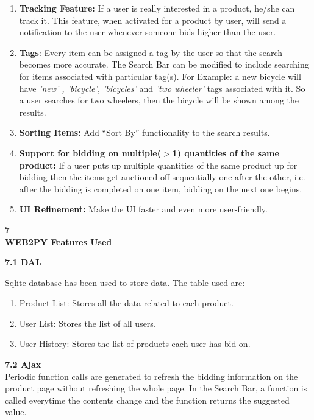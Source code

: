 \documentclass[a4paper,12pt]{article}
\begin{document}
{{\begin{enumerate}
\item
\textbf{Tracking Feature:} If a user is really interested in a product, he/she can track it. This feature, when activated for a product by user, will send a notification to the user whenever someone bids higher than the user.
\item
\textbf{Tags}: Every item can be assigned a tag by the user so that the search becomes more accurate. The Search Bar can be modified to include searching for items associated with particular tag(s). For Example: a new bicycle will have \emph{'new' , 'bicycle', 'bicycles'} and \emph{'two wheeler'} tags associated with it. So a user searches for two wheelers, then the bicycle will be shown among the results. 
\item
\textbf{Sorting Items:} Add ``Sort By'' functionality to the search results.
\item
\textbf{Support for bidding on multiple($>$1) quantities of the same product:} If a user puts up multiple quantities of the same product up for bidding then the items get auctioned off sequentially one after the other, i.e. after the bidding is completed on one item, bidding on the next one begins.
\item
\textbf{UI Refinement:} Make the UI faster and even more user-friendly.

\end{enumerate}

\huge{\textbf{7 \\ WEB2PY Features Used }} \\ \vspace{12pt}

\normalsize

\large {\textbf{7.1 DAL }} \\ \vspace{10pt}

\hspace{15pt} Sqlite database has been used to store data. The table used are:
\begin{enumerate}
 \item Product List: Stores all the data related to each product.
 \item User List: Stores the list of all users.
 \item User History: Stores the list of products each user has bid on. \\ \vspace{5pt}
\end{enumerate}


\large {\textbf{7.2 Ajax }} \\ \vspace{10pt}
\hspace{15pt} Periodic function calls are generated to refresh the bidding information on the product page without refreshing the whole page. In the Search Bar, a function is called everytime the contents change and the function returns the suggested value. \\ \vspace{5pt}

}}
\end{document}

